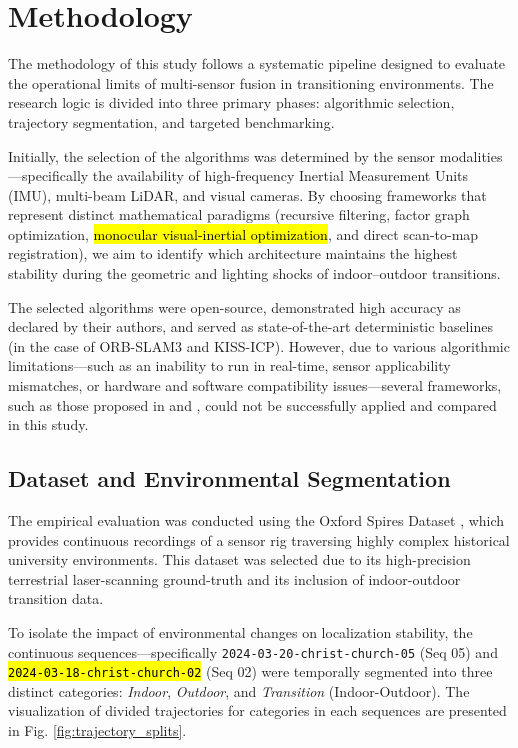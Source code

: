 \documentclass[pdflatex,sn-mathphys-num]{sn-jnl}
\theoremstyle{thmstyleone}%
\theoremstyle{thmstyletwo}%
\theoremstyle{thmstylethree}%
\begin{document}
\section{Methodology}

The methodology of this study follows a systematic pipeline designed to evaluate the operational limits of multi-sensor fusion in transitioning environments. The research logic is divided into three primary phases: algorithmic selection, trajectory segmentation, and targeted benchmarking. 

Initially, the selection of the algorithms was determined by the sensor modalities—specifically the availability of high-frequency Inertial Measurement Units (IMU), multi-beam LiDAR, and visual cameras. By choosing frameworks that represent distinct mathematical paradigms (recursive filtering, factor graph optimization, \hl{monocular visual-inertial optimization}, and direct scan-to-map registration), we aim to identify which architecture maintains the highest stability during the geometric and lighting shocks of indoor–outdoor transitions. 

The selected algorithms were open-source, demonstrated high accuracy as declared by their authors, and served as state-of-the-art deterministic baselines (in the case of ORB-SLAM3 and KISS-ICP). However, due to various algorithmic limitations—such as an inability to run in real-time, sensor applicability mismatches, or hardware and software compatibility issues—several frameworks, such as those proposed in \cite{BEDKOWSKI2024101618} and \cite{nubert2021self}, could not be successfully applied and compared in this study.

\subsection{Dataset and Environmental Segmentation}
The empirical evaluation was conducted using the Oxford Spires Dataset \cite{tao2025spires}, which provides continuous recordings of a sensor rig traversing highly complex historical university environments. This dataset was selected due to its high-precision terrestrial laser-scanning ground-truth and its inclusion of indoor-outdoor transition data. 

To isolate the impact of environmental changes on localization stability, the continuous sequences—specifically \texttt{2024-03-20-christ-church-05} (Seq 05) and \hl{\texttt{2024-03-18-christ-church-02}} (Seq 02) were temporally segmented into three distinct categories: \textit{Indoor}, \textit{Outdoor}, and \textit{Transition} (Indoor-Outdoor). The visualization of divided trajectories for categories in each sequences are presented in Fig. \ref{fig:trajectory_splits}.
\end{document}

